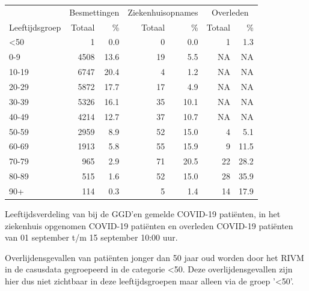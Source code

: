 \documentclass[
  english,
  man,floatsintext]{apa6}
\begin{document}
\begin{table}
\centering\begingroup\fontsize{11}{13}\selectfont

\begin{threeparttable}
\begin{tabular}{lrrrrrr}
\toprule
\multicolumn{1}{c}{ } & \multicolumn{2}{c}{Besmettingen} & \multicolumn{2}{c}{Ziekenhuisopnames} & \multicolumn{2}{c}{Overleden} \\
\cmidrule(l{3pt}r{3pt}){2-3} \cmidrule(l{3pt}r{3pt}){4-5} \cmidrule(l{3pt}r{3pt}){6-7}
Leeftijdsgroep & Totaal & \% & Totaal & \% & Totaal & \%\\
\midrule
<50 & 1 & 0.0 & 0 & 0.0 & 1 & 1.3\\
0-9 & 4508 & 13.6 & 19 & 5.5 & NA & NA\\
10-19 & 6747 & 20.4 & 4 & 1.2 & NA & NA\\
20-29 & 5872 & 17.7 & 17 & 4.9 & NA & NA\\
30-39 & 5326 & 16.1 & 35 & 10.1 & NA & NA\\
40-49 & 4214 & 12.7 & 37 & 10.7 & NA & NA\\
50-59 & 2959 & 8.9 & 52 & 15.0 & 4 & 5.1\\
60-69 & 1913 & 5.8 & 55 & 15.9 & 9 & 11.5\\
70-79 & 965 & 2.9 & 71 & 20.5 & 22 & 28.2\\
80-89 & 515 & 1.6 & 52 & 15.0 & 28 & 35.9\\
90+ & 114 & 0.3 & 5 & 1.4 & 14 & 17.9\\
\bottomrule
\end{tabular}
\begin{tablenotes}
\item[1] Leeftijdsverdeling van bij de GGD’en gemelde COVID-19 patiënten, in het ziekenhuis opgenomen COVID-19 patiënten en overleden COVID-19 patiënten van 01 september t/m 15 september 10:00 uur.
\item[2] Overlijdensgevallen van patiënten jonger dan 50 jaar oud worden door het RIVM in de casusdata gegroepeerd in de categorie <50. Deze overlijdensgevallen zijn hier dus niet zichtbaar in deze leeftijdsgroepen maar alleen via de groep '<50'.
\end{tablenotes}
\end{threeparttable}
\endgroup{}
\end{table}

\newpage
\end{document}
